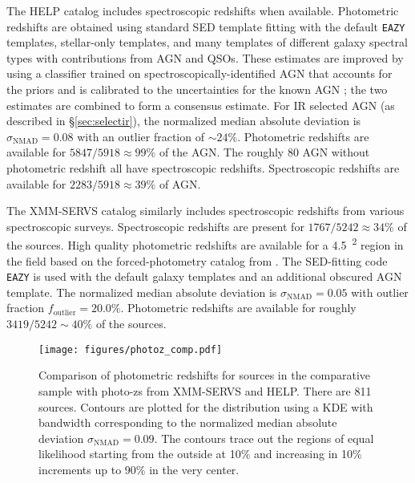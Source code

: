 \documentclass[twocolumn, trackchanges]{aastex63}
\begin{document}
The HELP catalog includes spectroscopic redshifts when available.
Photometric redshifts are obtained using standard SED template fitting \citep{duncanI2018MNRAS.473.2655D} with the default \texttt{EAZY} \citep{brammer_eazy_2008} templates, stellar-only templates, and many templates of different galaxy spectral types with contributions from AGN and QSOs.
These estimates are improved by using a classifier trained on spectroscopically-identified AGN that accounts for the priors and is calibrated to the uncertainties for the known AGN \citep{duncanII2018MNRAS.477.5177D}; the two estimates are combined to form a consensus estimate.
For IR selected AGN (as described in \S\ref{sec:selectir}), the normalized median absolute deviation is $\sigma_\mathrm{NMAD}=0.08$ with an outlier fraction of $\sim24\%$.
Photometric redshifts are available for $5847/5918\approx 99\%$ of the AGN.
The roughly 80 AGN without photometric redshift all have spectroscopic redshifts.
Spectroscopic redshifts are available for $2283/5918\approx 39\%$ of AGN.

The XMM-SERVS catalog similarly includes spectroscopic redshifts from various spectroscopic surveys.
Spectroscopic redshifts are present for $1767/5242\approx 34\%$ of the sources.
High quality photometric redshifts are available for a \SI{4.5}{\deg^2} region in the field based on the forced-photometry catalog from \cite{pforr_photometric_2019}.
The SED-fitting code \texttt{EAZY} is used with the default galaxy templates and an additional obscured AGN template.
The normalized median absolute deviation is $\sigma_\mathrm{NMAD}=0.05$ with outlier fraction $f_\mathrm{outlier}=20.0\%$.
Photometric redshifts are available for roughly $3419/5242\sim40\%$ of the sources.

\begin{figure}[htpb]
\centering
\texttt{[image: figures/photoz\_comp.pdf]}
\caption{Comparison of photometric redshifts for sources in the comparative sample with photo-zs from XMM-SERVS and HELP. There are 811 sources. Contours are plotted for the distribution using a KDE with bandwidth corresponding to the normalized median absolute deviation $\sigma_\mathrm{NMAD}=0.09$. The contours trace out the regions of equal likelihood starting from the outside at 10\% and increasing in 10\% increments up to 90\% in the very center.}
\label{fig:photozcomp}
\end{figure}
\end{document}
